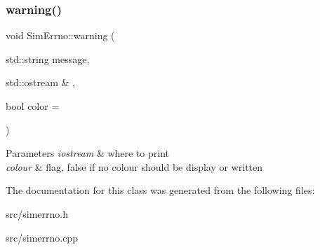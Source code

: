 \subsubsection{\texorpdfstring{warning()}{warning()}}
{\footnotesize\ttfamily void Sim\+Errno\+::warning (\begin{DoxyParamCaption}\item[{std\+::string}]{message,  }\item[{std\+::ostream \&}]{,  }\item[{bool}]{color = {} }\end{DoxyParamCaption})\hspace{0.3cm}{\ttfamily [static]}}


\begin{DoxyParams}{Parameters}
{\em iostream} & where to print \\
\hline
{\em colour} & flag, false if no colour should be display or written \\
\hline
\end{DoxyParams}


The documentation for this class was generated from the following files\+:\begin{DoxyCompactItemize}
\item 
src/simerrno.\+h\item 
src/simerrno.\+cpp\end{DoxyCompactItemize}
